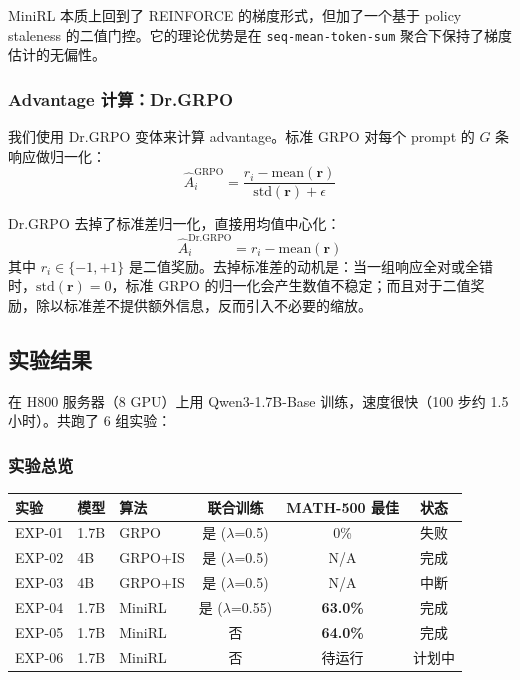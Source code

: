 \documentclass[11pt,a4paper]{article}
\begin{document}
MiniRL 本质上回到了 REINFORCE 的梯度形式，但加了一个基于 policy staleness 的二值门控。它的理论优势是在 \texttt{seq-mean-token-sum} 聚合下保持了梯度估计的无偏性。

\subsubsection{Advantage 计算：Dr.GRPO}

我们使用 Dr.GRPO 变体来计算 advantage。标准 GRPO 对每个 prompt 的 $G$ 条响应做归一化：
\begin{equation}
\hat{A}_i^{\text{GRPO}} = \frac{r_i - \text{mean}(\mathbf{r})}{\text{std}(\mathbf{r}) + \epsilon}
\end{equation}

Dr.GRPO 去掉了标准差归一化，直接用均值中心化：
\begin{equation}
\hat{A}_i^{\text{Dr.GRPO}} = r_i - \text{mean}(\mathbf{r})
\end{equation}
其中 $r_i \in \{-1, +1\}$ 是二值奖励。去掉标准差的动机是：当一组响应全对或全错时，$\text{std}(\mathbf{r}) = 0$，标准 GRPO 的归一化会产生数值不稳定；而且对于二值奖励，除以标准差不提供额外信息，反而引入不必要的缩放。

\subsection{实验结果}

在 H800 服务器（8 GPU）上用 Qwen3-1.7B-Base 训练，速度很快（100 步约 1.5 小时）。共跑了 6 组实验：

\subsubsection{实验总览}

\begin{table}[h]
\centering
\begin{tabular}{lllccc}
\toprule
\textbf{实验} & \textbf{模型} & \textbf{算法} & \textbf{联合训练} & \textbf{MATH-500 最佳} & \textbf{状态} \\
\midrule
EXP-01 & 1.7B & GRPO & 是 ($\lambda$=0.5) & 0\% & 失败 \\
EXP-02 & 4B & GRPO+IS & 是 ($\lambda$=0.5) & N/A & 完成 \\
EXP-03 & 4B & GRPO+IS & 是 ($\lambda$=0.5) & N/A & 中断 \\
EXP-04 & 1.7B & MiniRL & 是 ($\lambda$=0.55) & \textbf{63.0\%} & 完成 \\
EXP-05 & 1.7B & MiniRL & 否 & \textbf{64.0\%} & 完成 \\
EXP-06 & 1.7B & MiniRL & 否 & 待运行 & 计划中 \\
\bottomrule
\end{tabular}
\end{table}
\end{document}
